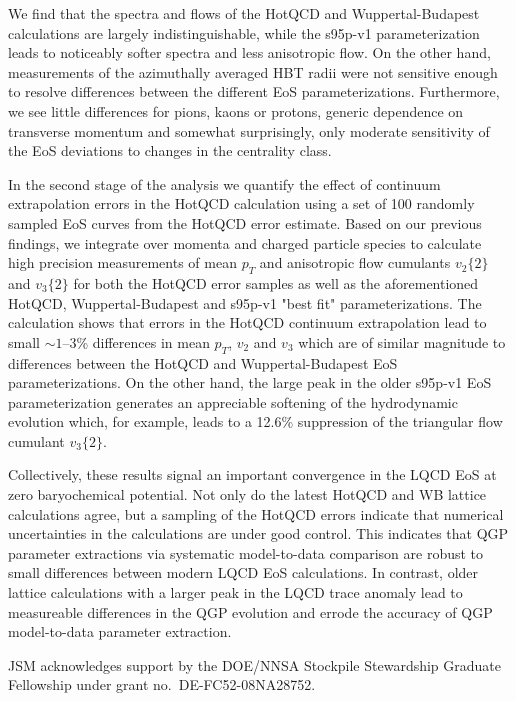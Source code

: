 \documentclass[aps,prc,reprint,amsmath,nofootinbib,superscriptaddress]{revtex4-1}
\begin{document}
We find that the spectra and flows of the HotQCD and Wuppertal-Budapest calculations are largely indistinguishable, while the s95p-v1 parameterization leads to noticeably softer spectra and less anisotropic flow. On the other hand, measurements of the azimuthally averaged HBT radii were not sensitive enough to resolve differences between the different EoS parameterizations. Furthermore, we see little differences for pions, kaons or protons, generic dependence on transverse momentum and somewhat surprisingly, only moderate sensitivity of the EoS deviations to changes in the centrality class.

In the second stage of the analysis we quantify the effect of continuum extrapolation errors in the HotQCD calculation using a set of 100 randomly sampled EoS curves from the HotQCD error estimate. Based on our previous findings, we integrate over momenta and charged particle species to calculate high precision measurements of mean $p_T$ and anisotropic flow cumulants
$v_2\{2\}$ and $v_3\{2\}$ for both the HotQCD error samples as well as the aforementioned HotQCD, Wuppertal-Budapest and s95p-v1 "best fit" parameterizations. The calculation shows that
errors in the HotQCD continuum extrapolation lead to small $\sim\!1$--3\% differences in mean $p_T$, $v_2$ and $v_3$ which are of similar magnitude to differences between the HotQCD and Wuppertal-Budapest EoS parameterizations. On the other hand, the large peak in the older s95p-v1 EoS parameterization generates an appreciable softening of the hydrodynamic evolution which, for example, leads to a 12.6\% suppression of the triangular flow cumulant $v_3\{2\}$.

Collectively, these results signal an important convergence in the LQCD EoS at zero baryochemical potential. Not only do the latest HotQCD and WB lattice calculations agree, but a sampling of the HotQCD errors indicate that numerical uncertainties in the calculations are under good control. This indicates that QGP parameter extractions via systematic model-to-data comparison are robust to small differences between modern LQCD EoS calculations. In contrast, older lattice calculations with a larger peak in the LQCD trace anomaly lead to measureable differences in the QGP evolution and errode the accuracy of QGP model-to-data parameter extraction.

\begin{acknowledgments}
 JSM acknowledges support by the DOE/NNSA Stockpile Stewardship Graduate Fellowship under grant no.~DE-FC52-08NA28752.
\end{acknowledgments}


\end{document}
